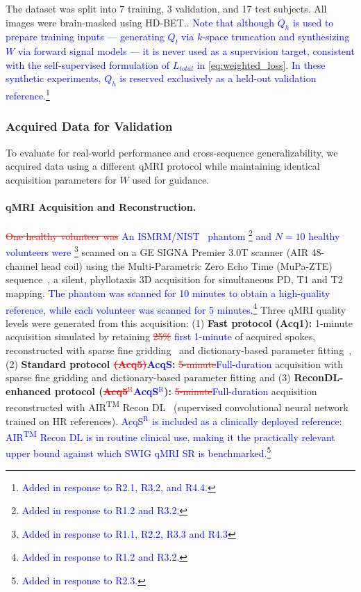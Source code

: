 \documentclass[journal,twoside,web]{ieeecolor}
\newcommand{\added}[1]{\textcolor{blue}{#1}}      %
\newcommand{\deleted}[1]{\textcolor{red}{\st{#1}}} %
\begin{document}
The dataset was split into 7 training, 3 validation, and 17 test subjects. All images were brain-masked using HD-BET.\cite{b12}.
\added{Note that although $Q_h$ is used to prepare training inputs --- generating $Q_l$ via $k$-space truncation and synthesizing $W$ via forward signal models --- it is never used as a supervision target, consistent with the self-supervised formulation of $L_{total}$ in \eqref{eq:weighted_loss}. In these synthetic experiments, $Q_h$ is reserved exclusively as a held-out validation reference.\footnote{\textcolor{blue}{Added in response to R2.1, R3.2, and R4.4.}}}

\subsubsection{Acquired Data for Validation}
\label{acquired_data}

To evaluate for real-world performance and cross-sequence generalizability, we acquired data using a different qMRI protocol while maintaining identical acquisition parameters for $W$  used for guidance.

\paragraph{qMRI Acquisition and Reconstruction.}
\deleted{One healthy volunteer was} \added{An ISMRM/NIST~\cite{b28} phantom \footnote{\textcolor{blue}{Added in response to R1.2 and R3.2.}}  and $N=10$ healthy volunteers were \footnote{\textcolor{blue}{Added in response to R1.1, R2.2, R3.3 and R4.3}}} scanned on a GE SIGNA Premier 3.0T scanner (AIR 48-channel head coil) using the Multi-Parametric Zero Echo Time (MuPa-ZTE) sequence~\cite{b13,b14}, a silent, phyllotaxis 3D acquisition for simultaneous PD, T1 and T2 mapping. \added{The phantom was scanned for 10 minutes to obtain a high-quality reference, while each volunteer was scanned for 5 minutes.\footnote{\textcolor{blue}{Added in response to R1.2 and R3.2.}} } Three qMRI quality levels were generated from this acquisition: (1) \textbf{Fast protocol (Acq1):} 1-minute acquisition simulated by retaining \deleted{25\%} \added{first 1-minute} of acquired spokes, reconstructed with sparse fine gridding~\cite{b15} and dictionary-based parameter fitting~\cite{b16,b17}, (2) \textbf{Standard protocol \deleted{(Acq5)}\added{AcqS}:} \deleted{5-minute}\added{Full-duration} acquisition with sparse fine gridding and dictionary-based parameter fitting and (3) \textbf{ReconDL-enhanced protocol 
(\deleted{Acq5$^{\text{R}}$}\added{AcqS$^{\text{R}}$}):} 
\deleted{5-minute}\added{Full-duration} acquisition reconstructed with 
AIR\textsuperscript{TM} Recon DL~\cite{b18,b19} (supervised 
convolutional neural network trained on HR references). 
\added{AcqS$^{\text{R}}$ is included as a clinically deployed reference: AIR\textsuperscript{TM} Recon DL is in routine clinical 
use, making it the practically relevant upper bound against which SWIG qMRI SR is benchmarked.\footnote{\textcolor{blue}{Added in 
response to R2.3.}}}
\end{document}
